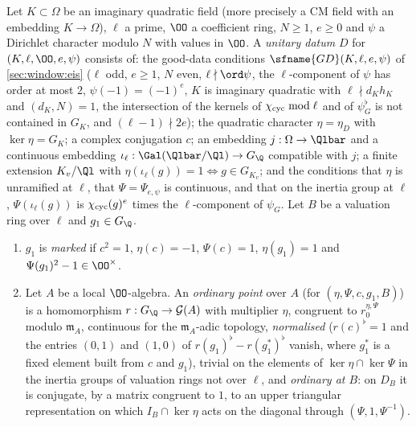 \begin{definition}\label{pf:modularity:dat}
Let $K\subset\Omega$ be an imaginary quadratic field (more precisely a CM field with an embedding $K\to\Omega$), $\ell$
a prime, $\OO$ a coefficient ring, $N\ge1$, $e\ge0$ and $\psi$ a Dirichlet character modulo $N$ with values in $\OO$.
A \emph{unitary datum} $D$ for $(K,\ell,\OO,e,\psi)$ consists of: the good-data conditions
$\sfname{GD}(K,\ell,e,\psi)$ of \cref{sec:window:eis} ($\ell$ odd, $e\ge1$, $N$ even, $\ell\nmid\ord\psi$, the
$\ell$-component of $\psi$ has order at most $2$, $\psi(-1)=(-1)^e$, $K$ is imaginary quadratic with
$\ell\nmid d_Kh_K$ and $(d_K,N)=1$, the intersection of the kernels of $\chi_{\mathrm{cyc}}\bmod\ell$ and of
$\psi^\flat_G$ is not contained in $G_K$, and $(\ell-1)\nmid2e$); the quadratic character
$\eta=\eta_D$ with $\ker\eta=G_K$; a complex conjugation $c$; an embedding $j:\Omega\to\Qlbar$ and a continuous embedding
$\iota_\ell:\Gal(\Qlbar/\Ql)\to G_\Q$ compatible with $j$; a finite extension $K_v/\Ql$ with
$\eta(\iota_\ell(g))=1\iff g\in G_{K_v}$; and the conditions that $\eta$ is unramified at $\ell$, that
$\Psi=\Psi_{e,\psi}$ is continuous, and that on the inertia group at $\ell$, $\Psi(\iota_\ell(g))$ is
$\chi_{\mathrm{cyc}}(g)^e$ times the $\ell$-component of $\psi_G$. Let $B$ be a valuation ring over $\ell$ and $g_1\in G_\Q$.
\begin{enumerate}[label=(\alph*)]
\item $g_1$ is \emph{marked} if $c^2=1$, $\eta(c)=-1$, $\Psi(c)=1$, $\eta(g_1)=1$ and $\Psi(g_1)^2-1\in\OO^\times$.
\item Let $A$ be a local $\OO$-algebra. An \emph{ordinary point} over $A$ (for $(\eta,\Psi,c,g_1,B)$) is a homomorphism
$r:G_\Q\to\modularityG(A)$ with multiplier $\eta$, congruent to $r_0^{\eta,\Psi}$ modulo $\mathfrak m_A$, continuous for the
$\mathfrak m_A$-adic topology, \emph{normalised} ($r(c)^\flat=1$ and the entries $(0,1)$ and $(1,0)$ of
$r(g_1)^\flat-r(g_1^\ast)^\flat$ vanish, where $g_1^\ast$ is a fixed element built from $c$ and $g_1$), trivial on the
elements of $\ker\eta\cap\ker\Psi$ in the inertia groups
of valuation rings not over $\ell$, and \emph{ordinary at $B$}: on $D_B$ it is conjugate, by a matrix congruent to $1$,
to an upper triangular representation on which $I_B\cap\ker\eta$ acts on the diagonal through
$(\Psi,1,\Psi^{-1})$.
\end{enumerate}
\end{definition}

